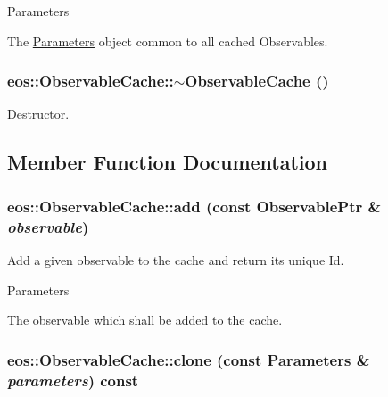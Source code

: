 \begin{DoxyParams}{Parameters}
\item[{\em parameters}]The \hyperlink{classeos_1_1Parameters}{Parameters} object common to all cached Observables. \end{DoxyParams}
\hypertarget{classeos_1_1ObservableCache_aee7b3cb68fe74a44faff0fed5547830d}{
\subsubsection[{$\sim$ObservableCache}]{\setlength{\rightskip}{0pt plus 5cm}eos::ObservableCache::$\sim$ObservableCache ()}}
\label{classeos_1_1ObservableCache_aee7b3cb68fe74a44faff0fed5547830d}


Destructor. 

\subsection{Member Function Documentation}
\hypertarget{classeos_1_1ObservableCache_a5994a8d42de0afabc01d401ef8bf27af}{
\subsubsection[{add}]{ eos::ObservableCache::add (const {\bf ObservablePtr} \& {\em observable})}}
\label{classeos_1_1ObservableCache_a5994a8d42de0afabc01d401ef8bf27af}
Add a given observable to the cache and return its unique Id.


\begin{DoxyParams}{Parameters}
\item[{\em observable}]The observable which shall be added to the cache. \end{DoxyParams}
\hypertarget{classeos_1_1ObservableCache_af1f92ddabdeb26ae35ba66f8e6b73c18}{
\subsubsection[{clone}]{ eos::ObservableCache::clone (const {\bf Parameters} \& {\em parameters}) const}}
\label{classeos_1_1ObservableCache_af1f92ddabdeb26ae35ba66f8e6b73c18}


